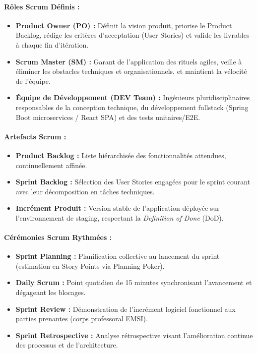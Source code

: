 \documentclass[11pt,a4paper,titlepage]{article}
\begin{document}
\paragraph{Rôles Scrum Définis :}
\begin{itemize}[leftmargin=1.5cm]
    \item \textbf{Product Owner (PO) :} Définit la vision produit, priorise le Product Backlog, rédige les critères d'acceptation (User Stories) et valide les livrables à chaque fin d'itération.
    \item \textbf{Scrum Master (SM) :} Garant de l'application des rituels agiles, veille à éliminer les obstacles techniques et organisationnels, et maintient la vélocité de l'équipe.
    \item \textbf{Équipe de Développement (DEV Team) :} Ingénieurs pluridisciplinaires responsables de la conception technique, du développement fullstack (Spring Boot microservices / React SPA) et des tests unitaires/E2E.
\end{itemize}

\paragraph{Artefacts Scrum :}
\begin{itemize}[leftmargin=1.5cm]
    \item \textbf{Product Backlog :} Liste hiérarchisée des fonctionnalités attendues, continuellement affinée.
    \item \textbf{Sprint Backlog :} Sélection des User Stories engagées pour le sprint courant avec leur décomposition en tâches techniques.
    \item \textbf{Incrément Produit :} Version stable de l'application déployée sur l'environnement de staging, respectant la \textit{Definition of Done} (DoD).
\end{itemize}

\paragraph{Cérémonies Scrum Rythmées :}
\begin{itemize}[leftmargin=1.5cm]
    \item \textbf{Sprint Planning :} Planification collective au lancement du sprint (estimation en Story Points via Planning Poker).
    \item \textbf{Daily Scrum :} Point quotidien de 15 minutes synchronisant l'avancement et dégageant les blocages.
    \item \textbf{Sprint Review :} Démonstration de l'incrément logiciel fonctionnel aux parties prenantes (corps professoral EMSI).
    \item \textbf{Sprint Retrospective :} Analyse rétrospective visant l'amélioration continue des processus et de l'architecture.
\end{itemize}
\end{document}

